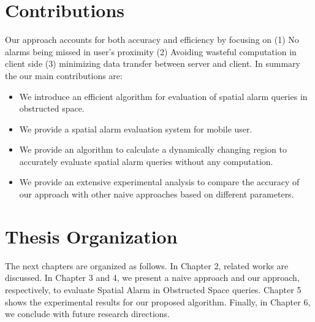 
\section{Contributions}

 Our approach accounts for both accuracy and efficiency by focusing on (1) No alarms being missed in user's proximity (2) Avoiding wasteful computation in client side (3) minimizing data transfer between server and client. In summary the our main contributions are: 
\begin{itemize}
\setlength\itemsep{0em}
\item We introduce an efficient algorithm for evaluation of spatial alarm queries in obstructed space.
\item We provide a spatial alarm evaluation system for mobile user.
\item We provide an algorithm to calculate a dynamically changing region to accurately evaluate spatial alarm queries without any computation.
\item We provide an extensive experimental analysis to compare the accuracy of our approach with other naive approaches based on different parameters.
\end{itemize}

\vspace*{8pt}


\section{Thesis Organization}
\label{sec:org}

\vspace*{5pt}

The next chapters are organized as follows. In Chapter 2, related works are discussed. In Chapter 3 and 4, we present a naive approach and our approach, respectively, to evaluate Spatial Alarm in Obstructed Space queries. Chapter 5 shows the experimental results for our proposed algorithm. Finally, in Chapter 6, we conclude with future research directions.


